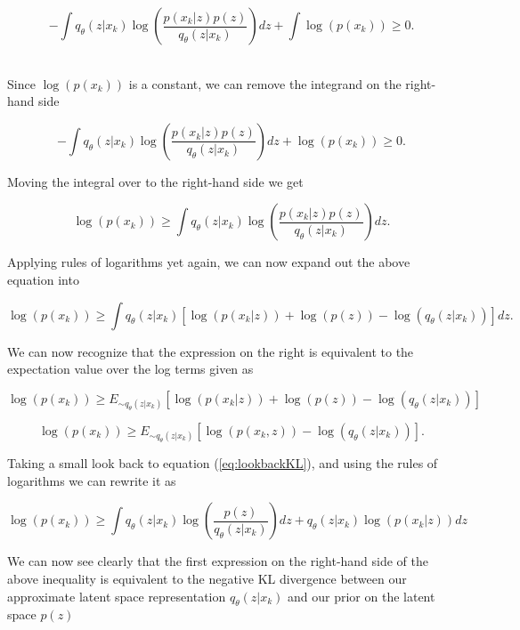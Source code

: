 \begin{equation}
    -\int q_{\theta}(z|x_k)
    \log(\frac{p(x_k|z) p(z)}{q_{\theta}(z|x_k)})dz +
    \int \log(p(x_k)) \geq 0. 
\end{equation}\

Since $\log(p(x_k))$ is a constant, we can remove the integrand 
on the right-hand side

\begin{equation}
    -\int q_{\theta}(z|x_k)
    \log(\frac{p(x_k|z) p(z)}{q_{\theta}(z|x_k)})dz +
    \log(p(x_k)) \geq 0.
\end{equation}

Moving the integral over to the right-hand side we get 

\begin{equation}
    \log(p(x_k)) \geq \int q_{\theta}(z|x_k)
    \log(\frac{p(x_k|z) p(z)}{q_{\theta}(z|x_k)})dz.\label{eq:lookbackKL}
\end{equation}

Applying rules of logarithms yet again, we can now expand 
out the above equation into 

\begin{equation}
    \log(p(x_k)) \geq \int q_{\theta}(z|x_k)
    [\log(p(x_k|z)) + \log(p(z)) - \log(q_{\theta}(z|x_k))] dz.
\end{equation}

We can now recognize that the expression on the right 
is equivalent to the expectation value over the log 
terms given as 

\begin{equation}
    \log(p(x_k)) \geq E_{\sim q_{\theta}(z|x_k)} 
    [\log(p(x_k|z)) + \log(p(z)) - \log(q_{\theta}(z|x_k))]
\end{equation}

\begin{equation}
    \log(p(x_k)) \geq E_{\sim q_{\theta}(z|x_k)} 
    [\log(p(x_k,z)) - \log(q_{\theta}(z|x_k))].
\end{equation}

Taking a small look back to equation (\ref{eq:lookbackKL}), 
and using the rules of logarithms we can rewrite it as 

\begin{equation}
    \log(p(x_k)) \geq \int q_{\theta}(z|x_k)
    \log(\frac{p(z)}{q_{\theta}(z|x_k)})dz + 
    q_{\theta}(z|x_k) \log({p(x_k|z)}) dz
\end{equation}

We can now see clearly that the first expression on the 
right-hand side of the above inequality is equivalent to the 
negative \ac{KL} divergence between our approximate latent space 
representation $q_{\theta}(z|x_k)$ and our prior on 
the latent space $p(z)$

